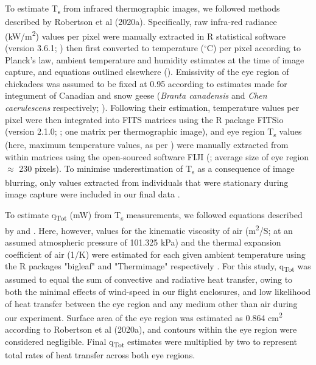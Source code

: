 \documentclass[12pt]{article}
\begin{document}
\noindent To estimate T\textsubscript{s} from infrared thermographic images, we followed methods described by Robertson et al (2020a). Specifically, raw infra-red radiance (kW/m\textsuperscript{2}) values per pixel were manually extracted in R statistical software (version 3.6.1; \citealt{rcore_2019}) then first converted to temperature ($^{\circ}$C) per pixel according to Planck's law, ambient temperature and humidity estimates at the time of image capture, and equations outlined elsewhere (\citealt{minkina_2009,tattersall_2016}). Emissivity of the eye region of chickadees was assumed to be fixed at 0.95 according to estimates made for integument of Canadian and snow geese (\textit{Branta canadensis} and \textit{Chen caerulescens} respectively; \citealt{best_1981}). Following their estimation, temperature values per pixel were then integrated into FITS matrices using the R package FITSio (version 2.1.0; \citealt{harris_2016}; one matrix per thermographic image), and eye region T\textsubscript{s} values (here, maximum temperature values, as per \citealt{jerem_2015}) were manually extracted from within matrices using the open-sourced software FIJI (\citealt{schindelin_2012}; average size of eye region $\approx$ 230 pixels). To minimise underestimation of T\textsubscript{s} as a consequence of image blurring, only values extracted from individuals that were stationary during image capture were included in our final data \citep{tattersall_2016}. \vspace{1cm}

\noindent To estimate q\textsubscript{Tot} (mW) from T\textsubscript{s} measurements, we followed equations described by \citet{mccafferty_2011} and \citet{nord_2019}. Here, however, values for the kinematic viscosity of air (m\textsuperscript{2}/S; at an assumed atmospheric pressure of 101.325 kPa) and the thermal expansion coefficient of air (1/K) were estimated for each given ambient temperature using the R packages "bigleaf" and "Thermimage" respectively \citep{bigleaf,thermimage}. For this study, q\textsubscript{Tot} was assumed to equal the sum of convective and radiative heat transfer, owing to both the minimal effects of wind-speed in our flight enclosures, and low likelihood of heat transfer between the eye region and any medium other than air during our experiment. Surface area of the eye region was estimated as 0.864 cm\textsuperscript{2} according to Robertson et al (2020a), and contours within the eye region were considered negligible. Final q\textsubscript{Tot} estimates were multiplied by two to represent total rates of heat transfer across both eye regions.\vspace{0.5cm}
\end{document}
